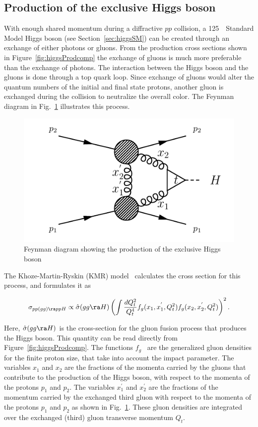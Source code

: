 \subsection{Production of the exclusive Higgs boson}
\label{sec:exclH}
\par With enough shared momentum during a diffractive $pp$ collision, a 125~\GeV\ Standard 
Model Higgs boson (see Section~\ref{sec:higgsSM}) can be created through an exchange of either 
photons or gluons. From the production cross sections shown in Figure~\ref{fig:higgsProdcomp} the 
exchange of gluons is much more preferable than the exchange of photons. The interaction between the 
Higgs boson and the gluons is done through a top quark loop. Since exchange of gluons would 
alter the quantum numbers of the initial and final state protons, another gluon is exchanged 
during the collision to neutralize the overall color. The Feynman diagram in Fig.~\ref{fig:exclH} illustrates 
this process.
 
\begin{figure}[!h]
\centering
\includegraphics[width=0.8\linewidth]{figures/exclH.pdf}
\caption{Feynman diagram showing the production of the exclusive Higgs boson} 
\label{fig:exclH}
\end{figure}

\par The Khoze-Martin-Ryskin (KMR) model~\cite{Khoze} calculates the cross section for this process, and 
formulates it as 

\begin{equation}
\sigma_{pp(gg)\ra ppH} \propto \hat{\sigma}(gg\ra H)\left ( \int \frac{dQ^2_t}{Q^4_t}f_g(x_1, x_1^{'},Q^2_t)f_g(x_2, x_2^{'},Q^2_t)\right )^2. 
\end{equation}

Here, $\hat{\sigma}(gg\ra H)$ is the cross-section for the gluon fusion process that produces the Higgs boson. This quantity 
can be read directly from Figure~\ref{fig:higgsProdcomp}. The functions $f_g$~\cite{Martin} are the generalized gluon densities
for the finite proton size, that take into account the impact parameter. 
The variables $x_1$ and $x_2$ are the fractions of the momenta carried by the gluons that contribute 
to the production of the Higgs boson, with respect to the momenta of the 
protons $p_1$ and $p_2$. The variables $x_1^{'}$ and $x_2^{'}$ are the fractions 
of the momentum carried by the exchanged third gluon with respect to the momenta of the
protons $p_1$ and $p_2$ as shown in Fig.~\ref{fig:exclH}.
These gluon densities are integrated over the exchanged (third) gluon 
transverse momentum $Q_t$. 

